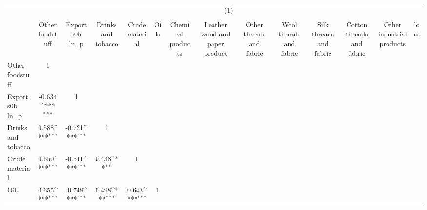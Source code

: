 {
\def\sym#1{\ifmmode^{#1}\else\(^{#1}\)\fi}
\begin{tabular}{l*{13}{c}}
\hline\hline
                &\multicolumn{13}{c}{(1)}                                                                                                                                                                                                                              \\
                &\multicolumn{13}{c}{}                                                                                                                                                                                                                                 \\
                &Other foodstuff         &Exports0b ln\_p         &Drinks and tobacco         &Crude material         &     Oils         &Chemical products         &Leather wood and paper product         &Other threads and fabric         &Wool threads and fabric         &Silk threads and fabric         &Cotton threads and fabric         &Other industrial products         &     loss         \\
\hline
Other foodstuff &        1         &                  &                  &                  &                  &                  &                  &                  &                  &                  &                  &                  &                  \\
Exports0b ln\_p  &   -0.634\sym{***}&        1         &                  &                  &                  &                  &                  &                  &                  &                  &                  &                  &                  \\
Drinks and tobacco&    0.588\sym{***}&   -0.721\sym{***}&        1         &                  &                  &                  &                  &                  &                  &                  &                  &                  &                  \\
Crude material  &    0.650\sym{***}&   -0.541\sym{***}&    0.438\sym{**} &        1         &                  &                  &                  &                  &                  &                  &                  &                  &                  \\
Oils            &    0.655\sym{***}&   -0.748\sym{***}&    0.498\sym{***}&    0.643\sym{***}&        1         &                  &                  &                  &                  &                  &                  &                  &                  \\

\end{tabular}}

